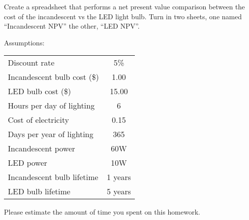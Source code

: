 \documentclass{article}
\begin{document}
Create a spreadsheet that performs a net present value comparison
between the cost of the incandescent vs the LED light bulb.  Turn in two
sheets, one named ``Incandescent NPV'' the other, ``LED NPV''.

Assumptions:

\begin{tabular}{l c}
Discount rate               & 5\% \\
Incandescent bulb cost (\$) & 1.00 \\
LED bulb cost (\$)          & 15.00 \\
Hours per day of lighting   & 6 \\
Cost of electricity         & 0.15 \\
Days per year of lighting   & 365 \\
Incandescent power          & 60W \\
LED power                   & 10W \\
Incandescent bulb lifetime  & 1 years \\
LED bulb lifetime           & 5 years \\
\end{tabular}



Please estimate the amount of time you spent on this homework.
\end{document}
